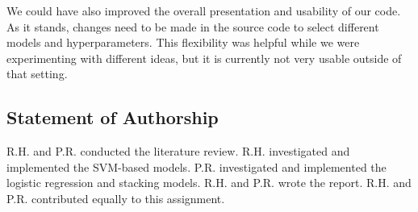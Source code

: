 \documentclass[11pt]{article}
\begin{document}
We could have also improved the overall presentation and usability of our code. As it stands, changes need to be made in the source code to select different models and hyperparameters. This flexibility was helpful while we were experimenting with different ideas, but it is currently not very usable outside of that setting.

\subsection*{Statement of Authorship}
R.H. and P.R. conducted the literature review. R.H. investigated and implemented the SVM-based models. P.R. investigated and implemented the logistic regression and stacking models. R.H. and P.R. wrote the report. R.H. and P.R. contributed equally to this assignment.
\end{document}
